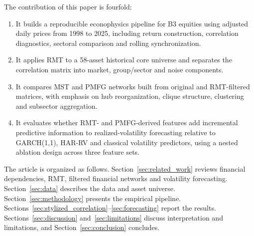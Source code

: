 The contribution of this paper is fourfold:
\begin{enumerate}
  \item It builds a reproducible econophysics pipeline for B3 equities using adjusted daily prices from 1998 to 2025, including return construction, correlation diagnostics, sectoral comparison and rolling synchronization.
  \item It applies RMT to a 58-asset historical core universe and separates the correlation matrix into market, group/sector and noise components.
  \item It compares MST and PMFG networks built from original and RMT-filtered matrices, with emphasis on hub reorganization, clique structure, clustering and subsector aggregation.
  \item It evaluates whether RMT- and PMFG-derived features add incremental predictive information to realized-volatility forecasting relative to GARCH(1,1), HAR-RV and classical volatility predictors, using a nested ablation design across three feature sets.
\end{enumerate}

The article is organized as follows. Section~\ref{sec:related_work} reviews financial dependencies, RMT, filtered financial networks and volatility forecasting. Section~\ref{sec:data} describes the data and asset universe. Section~\ref{sec:methodology} presents the empirical pipeline. Sections~\ref{sec:stylized_correlation}--\ref{sec:forecasting} report the results. Sections~\ref{sec:discussion} and~\ref{sec:limitations} discuss interpretation and limitations, and Section~\ref{sec:conclusion} concludes.
